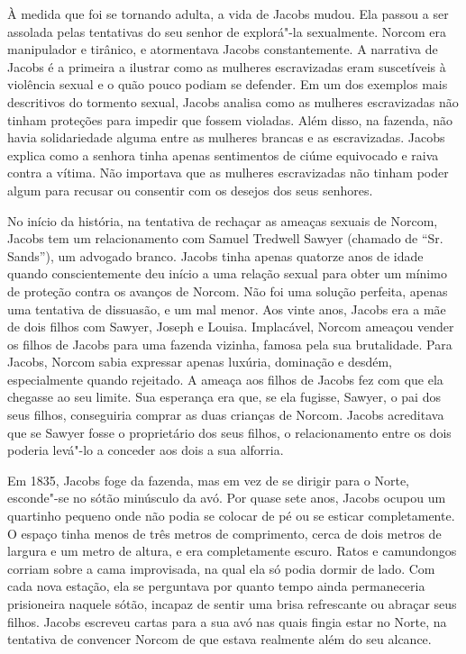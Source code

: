 À medida que foi se tornando adulta, a vida de Jacobs mudou. Ela passou
a ser assolada pelas tentativas do seu senhor de explorá"-la sexualmente.
Norcom era manipulador e tirânico, e atormentava Jacobs constantemente.
A narrativa de Jacobs é a primeira a ilustrar como as mulheres
escravizadas eram suscetíveis à violência sexual e o quão pouco podiam
se defender. Em um dos exemplos mais descritivos do tormento sexual,
Jacobs analisa como as mulheres escravizadas não tinham proteções para
impedir que fossem violadas. Além disso, na fazenda, não havia
solidariedade alguma entre as mulheres brancas e as escravizadas. Jacobs
explica como a senhora tinha apenas sentimentos de ciúme equivocado e
raiva contra a vítima. Não importava que as mulheres escravizadas não
tinham poder algum para recusar ou consentir com os desejos dos seus
senhores.

No início da história, na tentativa de rechaçar as ameaças sexuais de
Norcom, Jacobs tem um relacionamento com Samuel Tredwell Sawyer (chamado
de ``Sr.\,Sands''), um advogado branco. Jacobs tinha apenas quatorze anos
de idade quando conscientemente deu início a uma relação sexual para
obter um mínimo de proteção contra os avanços de Norcom. Não foi uma
solução perfeita, apenas uma tentativa de dissuasão, e um mal menor. Aos
vinte anos, Jacobs era a mãe de dois filhos com Sawyer, Joseph e Louisa.
Implacável, Norcom ameaçou vender os filhos de Jacobs para uma fazenda
vizinha, famosa pela sua brutalidade. Para Jacobs, Norcom sabia
expressar apenas luxúria, dominação e desdém, especialmente quando
rejeitado. A ameaça aos filhos de Jacobs fez com que ela chegasse ao seu limite.
Sua esperança era que, se ela fugisse, Sawyer, o pai dos seus filhos,
conseguiria comprar as duas crianças de Norcom. Jacobs acreditava que se
Sawyer fosse o proprietário dos seus filhos, o relacionamento entre os
dois poderia levá"-lo a conceder aos dois a sua alforria.

Em 1835, Jacobs foge da fazenda, mas em vez de se dirigir para o Norte,
esconde"-se no sótão minúsculo da avó. Por quase sete anos, Jacobs ocupou
um quartinho pequeno onde não podia se colocar de pé ou se esticar
completamente. O espaço tinha menos de três metros de comprimento, cerca
de dois metros de largura e um metro de altura, e era completamente
escuro. Ratos e camundongos corriam sobre a cama improvisada, na qual
ela só podia dormir de lado. Com cada nova estação, ela se perguntava
por quanto tempo ainda permaneceria prisioneira naquele sótão, incapaz
de sentir uma brisa refrescante ou abraçar seus filhos. Jacobs escreveu
cartas para a sua avó nas quais fingia estar no Norte, na tentativa de
convencer Norcom de que estava realmente além do seu alcance.

